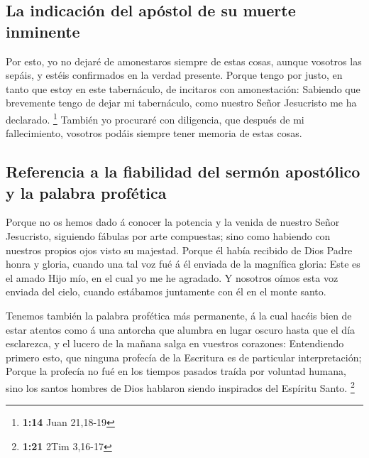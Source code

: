 \hypertarget{la-indicaciuxf3n-del-apuxf3stol-de-su-muerte-inminente}{%
\subsection{La indicación del apóstol de su muerte
inminente}\label{la-indicaciuxf3n-del-apuxf3stol-de-su-muerte-inminente}}

 Por esto, yo no dejaré de amonestaros siempre de estas
cosas, aunque vosotros las sepáis, y estéis confirmados en la verdad
presente.  Porque tengo por justo, en tanto que estoy en
este tabernáculo, de incitaros con amonestación:  Sabiendo
que brevemente tengo de dejar mi tabernáculo, como nuestro Señor
Jesucristo me ha declarado. \footnote{\textbf{1:14} Juan 21,18-19}
 También yo procuraré con diligencia, que después de mi
fallecimiento, vosotros podáis siempre tener memoria de estas cosas.

\hypertarget{referencia-a-la-fiabilidad-del-sermuxf3n-apostuxf3lico-y-la-palabra-profuxe9tica}{%
\subsection{Referencia a la fiabilidad del sermón apostólico y la
palabra
profética}\label{referencia-a-la-fiabilidad-del-sermuxf3n-apostuxf3lico-y-la-palabra-profuxe9tica}}

 Porque no os hemos dado á conocer la potencia y la venida
de nuestro Señor Jesucristo, siguiendo fábulas por arte compuestas; sino
como habiendo con nuestros propios ojos visto su majestad. 
Porque él había recibido de Dios Padre honra y gloria, cuando una tal
voz fué á él enviada de la magnífica gloria: Este es el amado Hijo mío,
en el cual yo me he agradado.  Y nosotros oímos esta voz
enviada del cielo, cuando estábamos juntamente con él en el monte santo.

 Tenemos también la palabra profética más permanente, á la
cual hacéis bien de estar atentos como á una antorcha que alumbra en
lugar oscuro hasta que el día esclarezca, y el lucero de la mañana salga
en vuestros corazones:  Entendiendo primero esto, que
ninguna profecía de la Escritura es de particular interpretación;
 Porque la profecía no fué en los tiempos pasados traída
por voluntad humana, sino los santos hombres de Dios hablaron siendo
inspirados del Espíritu Santo. \footnote{\textbf{1:21} 2Tim 3,16-17}

